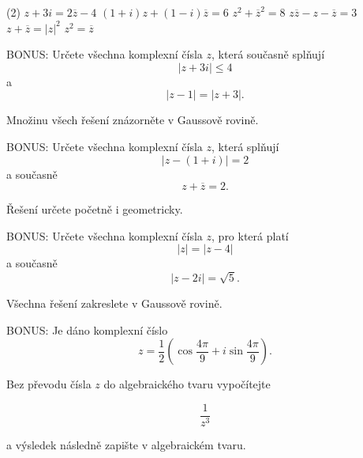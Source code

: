 \documentclass[12pt,a4paper]{article}
\begin{document}
\begin{exercise}
    \begin{tasks}(2)
        \task $z+3i=2\overline z-4$
        \task $(1+i)z+(1-i)\overline z=6$
        \task $z^2+\overline z^2=8$
        \task $z\overline z-z-\overline z=3$
        \task $z+\overline z=|z|^2$
        \task $z^2=\overline z$
    \end{tasks}
\end{exercise}


\begin{exercise}
    BONUS: Určete všechna komplexní čísla $z$, která současně splňují
    \[
        |z+3i|\leq4
    \]
    a
    \[
        |z-1|=|z+3|.
    \]
    
    Množinu všech řešení znázorněte v Gaussově rovině.
\end{exercise}


\begin{exercise}
    BONUS: Určete všechna komplexní čísla $z$, která splňují
    \[
        |z-(1+i)|=2
    \]
    a současně
    \[
        z+\overline z=2.
    \]
    
    Řešení určete početně i geometricky.
\end{exercise}


\begin{exercise}
    BONUS: Určete všechna komplexní čísla $z$, pro která platí
    \[
        |z|=|z-4|
    \]
    a současně
    \[
        |z-2i|=\sqrt5.
    \]
    
    Všechna řešení zakreslete v Gaussově rovině.
\end{exercise}


\begin{exercise}
    BONUS: Je dáno komplexní číslo
    \[
        z=
        \frac12
        \left(
            \cos\frac{4\pi}{9}
            +
            i\sin\frac{4\pi}{9}
        \right).
    \]
    
    Bez převodu čísla $z$ do algebraického tvaru vypočítejte
    
    \[
        \frac{1}{z^3}
    \]
    
    a výsledek následně zapište v algebraickém tvaru.
\end{exercise}
\end{document}

